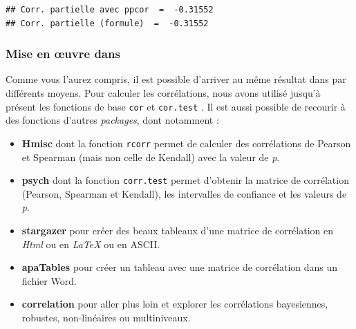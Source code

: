 \documentclass[
  11pt,
  french,
]{book}
\makeatletter
\newenvironment{Shaded}{\begin{snugshade}}{\end{snugshade}}
\newcommand{\CommentTok}[1]{\textcolor[rgb]{0.56,0.35,0.01}{\textit{#1}}}
\newcommand{\DataTypeTok}[1]{\textcolor[rgb]{0.13,0.29,0.53}{#1}}
\newcommand{\KeywordTok}[1]{\textcolor[rgb]{0.13,0.29,0.53}{\textbf{#1}}}
\newcommand{\NormalTok}[1]{#1}
\newcommand{\OperatorTok}[1]{\textcolor[rgb]{0.81,0.36,0.00}{\textbf{#1}}}
\newcommand{\StringTok}[1]{\textcolor[rgb]{0.31,0.60,0.02}{#1}}
\providecommand{\tightlist}{%
  \setlength{\itemsep}{0pt}\setlength{\parskip}{0pt}}
\newenvironment{kframe}{%
\medskip{}
\setlength{\fboxsep}{.8em}
 \def\at@end@of@kframe{}%
 \ifinner\ifhmode%
  \def\at@end@of@kframe{\end{minipage}}%
  \begin{minipage}{\columnwidth}%
 \fi\fi%
 \def\FrameCommand##1{\hskip\@totalleftmargin \hskip-\fboxsep
 \colorbox{shadecolor}{##1}\hskip-\fboxsep
     \hskip-\linewidth \hskip-\@totalleftmargin \hskip\columnwidth}%
 \MakeFramed {\advance\hsize-\width
   \@totalleftmargin\z@ \linewidth\hsize
   \@setminipage}}%
 {\par\unskip\endMakeFramed%
 \at@end@of@kframe}
\renewenvironment{Shaded}{\begin{kframe}}{\end{kframe}}
\makeatother
\begin{document}
\begin{verbatim}
## Corr. partielle avec ppcor  =  -0.31552 
## Corr. partielle (formule)  =  -0.31552
\end{verbatim}

\hypertarget{sect04137}{%
\subsubsection{Mise en œuvre dans}\label{sect04137}}

Comme vous l'aurez compris, il est possible d'arriver au même résultat dans par différents moyens. Pour calculer les corrélations, nous avons utilisé jusqu'à présent les fonctions de base \texttt{cor} et \texttt{cor.test} . Il est aussi possible de recourir à des fonctions d'autres \emph{packages}, dont notamment :

\begin{itemize}
\tightlist
\item
  \textbf{Hmisc} dont la fonction \texttt{rcorr} permet de calculer des corrélations de Pearson et Spearman (mais non celle de Kendall) avec la valeur de \emph{p}.
\item
  \textbf{psych} dont la fonction \texttt{corr.test} permet d'obtenir la matrice de corrélation (Pearson, Spearman et Kendall), les intervalles de confiance et les valeurs de \emph{p}.
\item
  \textbf{stargazer} pour créer des beaux tableaux d'une matrice de corrélation en \emph{Html} ou en \emph{LaTeX} ou en ASCII.
\item
  \textbf{apaTables} pour créer un tableau avec une matrice de corrélation dans un fichier Word.
\item
  \textbf{correlation} pour aller plus loin et explorer les corrélations bayesiennes, robustes, non-linéaires ou multiniveaux.
\end{itemize}

\begin{Shaded}
\end{Shaded}
\end{document}
